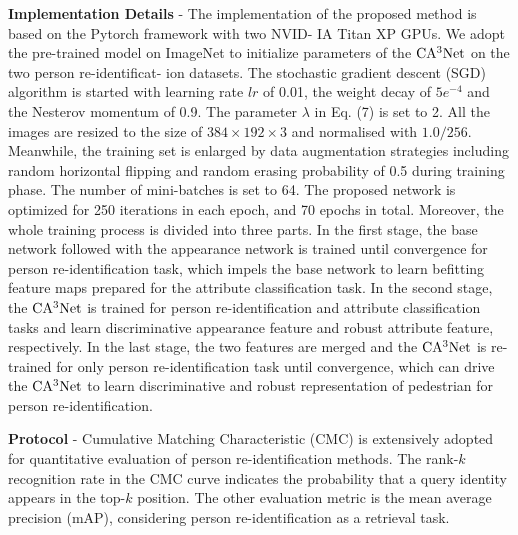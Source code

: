 \documentclass[sigconf]{acmart}
\begin{document}
\textbf{Implementation Details} - The implementation of the proposed method is based on the Pytorch framework with two NVID-
IA Titan XP GPUs. We adopt the pre-trained model on ImageNet to initialize parameters of the $\rm CA^3Net$ on the two person re-identificat-
ion datasets. The stochastic gradient descent (SGD) algorithm is started with learning rate $lr$ of 0.01, the weight decay of $5e^{-4}$ and the Nesterov momentum of 0.9. The parameter $\lambda$ in Eq. (7) is set to 2. All the images are resized to the size of $384\times192\times3$ and normalised with $1.0/256$. Meanwhile, the training set is enlarged by data augmentation strategies \cite{20} including random horizontal flipping and random erasing probability of 0.5 during training phase. The number of mini-batches is set to 64. The proposed network is optimized for 250 iterations in each epoch, and 70 epochs in total. Moreover, the whole training process is divided into three parts. In the first stage, the base network followed with the appearance network is trained until convergence for person re-identification task, which impels the base network to learn befitting feature maps prepared for the attribute classification task. In the second stage, the $\rm CA^3Net$ is trained for person re-identification and attribute classification tasks and learn discriminative appearance feature and robust attribute feature, respectively. In the last stage, the two features are merged and the $\rm CA^3Net$ is re-trained for only person re-identification task until convergence, which can drive the $\rm CA^3Net$ to learn discriminative and robust representation of pedestrian for person re-identification.

\textbf{Protocol} - Cumulative Matching Characteristic (CMC) is extensively adopted for quantitative evaluation of person re-identification methods. The rank-$k$ recognition rate in the CMC curve indicates the probability that a query identity appears in the top-$k$ position. The other evaluation metric is the mean average precision (mAP), considering person re-identification as a retrieval task.
\end{document}
